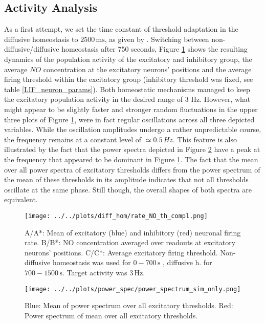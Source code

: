 \documentclass[10pt,a4paper]{article}
\begin{document}
\subsection{Activity Analysis} \label{activ_analys}
As a first attempt, we set the time constant of threshold adaptation in the diffusive homeostasis to $\mathrm{2500\, ms}$, as given by \cite{Sweeney_Paper}. Switching between non-diffusive/diffusive homeostasis after 750 seconds, Figure \ref{full_sim_osci} shows the resulting dynamics of the population activity of the excitatory and inhibitory group, the average $NO$ concentration at the excitatory neurons' positions and the average firing threshold within the excitatory group (inhibitory threshold was fixed, see table \ref{LIF_neuron_params}). Both homeostatic mechanisms managed to keep the excitatory population activity in the desired range of 3 Hz. However, what might appear to be slightly faster and stronger random fluctuations in the upper three plots of Figure \ref{full_sim_osci}, were in fact regular oscillations across all three depicted variables. While the oscillation amplitudes undergo a rather unpredictable course, the frequency remains at a constant level of $\simeq 0.5\, Hz$. This feature is also illustrated by the fact that the power spectra depicted in Figure \ref{Power_Spec_without_Analysis} have a peak at the frequency that appeared to be dominant in Figure \ref{full_sim_osci}. The fact that the mean over all power spectra of excitatory thresholds differs from the power spectrum of the mean of these thresholds in its amplitude indicates that not all thresholds oscillate at the same phase. Still though, the overall shapes of both spectra are equivalent.
\begin{figure}
\begin{center}
\texttt{[image: ../../plots/diff\_hom/rate\_NO\_th\_compl.png]}
\end{center}
\caption{A/A*: Mean of excitatory (blue) and inhibitory (red) neuronal firing rate. B/B*: NO concentration averaged over readouts at excitatory neurons' positions. C/C*: Average excitatory firing threshold. Non-diffusive homeostasis was used for $\mathrm{0-700\, s}$ , diffusive h. for $\mathrm{700-1500\, s}$. Target activity was $\mathrm{3\, Hz}$.}
\label{full_sim_osci}
\end{figure}
\begin{figure}
\begin{center}
\texttt{[image: ../../plots/power\_spec/power\_spectrum\_sim\_only.png]}
\caption{Blue: Mean of power spectrum over all excitatory thresholds. Red: Power spectrum of mean over all excitatory thresholds.}
\label{Power_Spec_without_Analysis}
\end{center}
\end{figure}
\end{document}
